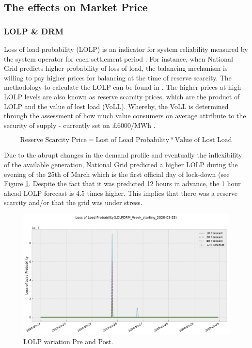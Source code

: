 \documentclass[energies,article,submit,moreauthors,pdftex]{Definitions/mdpi}
\begin{document}
\subsection{The effects on Market Price}\label{section:Market price}

\subsubsection{LOLP \& DRM}\label{section:LOLP_DRM}

Loss of load probability (LOLP) is an indicator for system reliability measured by the system operator for each settlement period \cite{ELEXON2019GuidanceBritain}. For instance, when National Grid predicts higher probability of loss of load, the balancing mechanism is willing to pay higher prices for balancing at the time of reserve scarcity. The methodology to calculate the LOLP can be found in \cite{Elexon2019LossStatement}. The higher prices at high LOLP levels are also known as reserve scarcity prices, which are the product of LOLP and the value of lost load (VoLL). Whereby, the VoLL is determined through the assessment of how much value consumers on average attribute to the security of supply - currently set on £6000/MWh \cite{ELEXON2019GuidanceBritain}. 

\[ \text{Reserve Scarcity Price} = \text{Lost of Load Probability} * \text{Value of Lost Load} \]

Due to the abrupt changes in the demand profile and eventually the inflexibility of the available generation, National Grid predicted a higher LOLP during the evening of the 25th of March which is the first official day of lock-down (see Figure \ref{fig:LOLP_25_03}. Despite the fact that it was predicted 12 hours in advance, the 1 hour ahead LOLP forecast is 4.5 times higher. This implies that there was a reserve scarcity and/or that the grid was under stress.

\begin{figure}[H]\centering
\hspace{-25pt}\includegraphics[width=15 cm]{Graphics/LOLPDRM_Week_starting_2020-03-23no4H.pdf}
\caption{LOLP variation Pre and Post.}\label{fig:LOLP_25_03}
\end{figure}  
\end{document}
